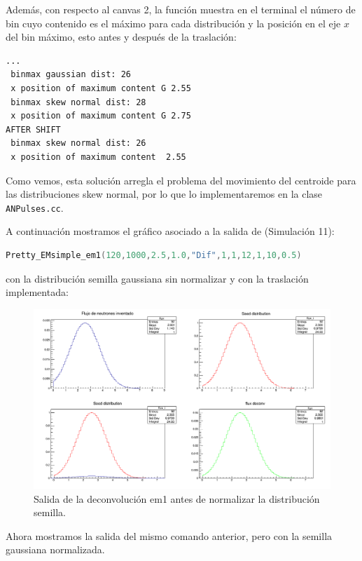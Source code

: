 \documentclass[11pt,letterpaper]{article}
\begin{document}
Además, con respecto al canvas 2, la función muestra en el terminal el número de bin cuyo contenido es el máximo para cada distribución y la posición en el eje $x$ del bin máximo, esto antes y después de la traslación:

\begin{lstlisting}
...
 binmax gaussian dist: 26
 x position of maximum content G 2.55
 binmax skew normal dist: 28
 x position of maximum content G 2.75
AFTER SHIFT
 binmax skew normal dist: 26
 x position of maximum content  2.55
\end{lstlisting}

Como vemos, esta solución arregla el problema del movimiento del centroide para las distribuciones skew normal, por lo que lo implementaremos en la clase \verb|ANPulses.cc|.

A continuación mostramos el gráfico asociado a la salida de (Simulación 11):
\begin{lstlisting}[language=c++]
Pretty_EMsimple_em1(120,1000,2.5,1.0,"Dif",1,1,12,1,10,0.5)
\end{lstlisting}
con la distribución semilla gaussiana sin normalizar y con la traslación implementada:

\begin{figure}[H]
    \includegraphics[width=1.\textwidth]{img/em1_antes_de_normalizar.png}
    \centering
     \cprotect\caption{Salida de la deconvolución em1 antes de normalizar la distribución semilla.} 
\label{plot_em1_antes_de_normalizar}
\end{figure}

Ahora mostramos la salida del mismo comando anterior, pero con la semilla gaussiana normalizada.
\end{document}

